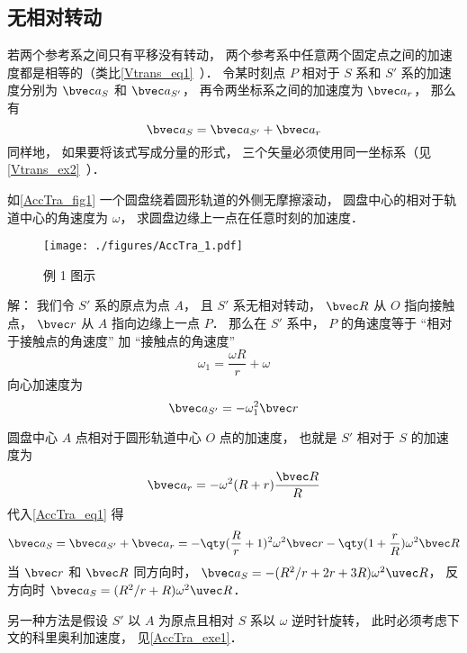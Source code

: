 

\subsection{无相对转动}
若两个参考系之间只有平移没有转动， 两个参考系中任意两个固定点之间的加速度都是相等的（类比\autoref{Vtrans_eq1}~）． 令某时刻点 $P$ 相对于 $S$ 系和 $S'$ 系的加速度分别为 $\bvec a_S$ 和 $\bvec a_{S'}$， 再令两坐标系之间的加速度为 $\bvec a_r$， 那么有
\begin{equation}\label{AccTra_eq1}
\bvec a_S = \bvec a_{S'} + \bvec a_r
\end{equation}
同样地， 如果要将该式写成分量的形式， 三个矢量必须使用同一坐标系（见\autoref{Vtrans_ex2}~）．

\begin{example}{}\label{AccTra_ex1}
如\autoref{AccTra_fig1} 一个圆盘绕着圆形轨道的外侧无摩擦滚动， 圆盘中心的相对于轨道中心的角速度为 $\omega$， 求圆盘边缘上一点在任意时刻的加速度．
\begin{figure}[ht]
\centering
\texttt{[image: ./figures/AccTra\_1.pdf]}
\caption{例 1 图示} \label{AccTra_fig1}
\end{figure}

解： 我们令 $S'$ 系的原点为点 $A$， 且 $S'$ 系无相对转动， $\bvec R$ 从 $O$ 指向接触点， $\bvec r$ 从 $A$ 指向边缘上一点 $P$． 那么在 $S'$ 系中， $P$ 的角速度等于 “相对于接触点的角速度” 加 “接触点的角速度”
\begin{equation}
\omega_1 = \frac{\omega R}{r} + \omega
\end{equation}
向心加速度为
\begin{equation}
\bvec a_{S'} = -\omega_1^2 \bvec r
\end{equation}

圆盘中心 $A$ 点相对于圆形轨道中心 $O$ 点的加速度， 也就是 $S'$ 相对于 $S$ 的加速度为
\begin{equation}
\bvec a_r = -\omega^2 (R + r)\frac{\bvec R}{R}
\end{equation}
代入\autoref{AccTra_eq1} 得
\begin{equation}
\bvec a_S = \bvec a_{S'} + \bvec a_r = -\qty(\frac{R}{r} + 1)^2 \omega^2\bvec r - \qty(1 + \frac{r}{R})\omega^2 \bvec R
\end{equation}
当 $\bvec r$ 和 $\bvec R$ 同方向时， $\bvec a_S = -(R^2/r + 2r + 3R)\omega^2 \uvec R$， 反方向时 $\bvec a_S = (R^2/r + R)\omega^2\uvec R$．



另一种方法是假设 $S'$ 以 $A$ 为原点且相对 $S$ 系以 $\omega$ 逆时针旋转， 此时必须考虑下文的科里奥利加速度， 见\autoref{AccTra_exe1}．
\end{example}

